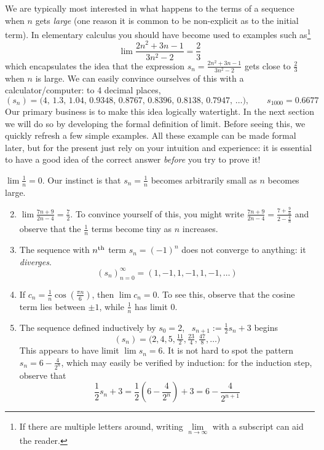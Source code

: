 We are typically most interested in what happens to the terms of a sequence when $n$ gets \emph{large} (one reason it is common to be non-explicit as to the initial term). In elementary calculus you should have become used to examples such as\footnote{%
	If there are multiple letters around, writing $\lim\limits_{n\to\infty}$ with a subscript can aid the reader.%
}
\[
	\lim\frac{2n^2+3n-1}{3n^2-2}=\frac 23
\]
which encapsulates the idea that the expression $s_n=\frac{2n^2+3n-1}{3n^2-2}$ gets close to $\frac 23$ when $n$ is large. We can easily convince ourselves of this with a calculator/computer: to 4 decimal places,
\[
	(s_n)=\bigl(4,\,1.3,\,1.04,\,
 	0.9348,\,
 	0.8767,\,
 	0.8396,\,
 	0.8138,\,
 	0.7947,\,\ldots\bigr),\qquad 
 	s_{1000}=0.6677
\]
Our primary business is to make this idea logically watertight. In the next section we will do so by developing the formal definition of limit. Before seeing this, we quickly refresh a few simple examples. All these example can be made formal later, but for the present just rely on your intuition and experience: it is essential to have a good idea of the correct answer \emph{before} you try to prove it!

\goodbreak

\begin{examples}{}{}
	\exstart $\lim \frac 1n=0$. Our instinct is that $s_n=\frac 1n$ becomes arbitrarily small as $n$ becomes large. 
	\begin{enumerate}\setcounter{enumi}{1}
	  \item $\lim\frac{7n+9}{2n-4}=\frac 72$. To convince yourself of this, you might write $\frac{7n+9}{2n-4}=\frac{7+\frac 9n}{2-\frac 4n}$
	  and observe that the $\frac 1n$ terms become tiny as $n$ increases.
	  \item The sequence with $n\textsuperscript{th}$ term $s_n=(-1)^n$ does not converge to anything: it \emph{diverges}.
	  \[
	  	(s_n)_{n=0}^\infty=(1,-1,1,-1,1,-1,\ldots)
	  \]
	  \item If $c_n=\frac 1n\cos\left(\frac{\pi n}6\right)$, then $\lim c_n=0$. To see this, observe that the cosine term lies between $\pm 1$, while $\frac 1n$ has limit 0.
	  \item The sequence defined inductively by $s_0=2$, \ $s_{n+1}:=\frac 12s_n+3$ begins
	  \[
	  	(s_n)=\bigl(2,4,5,\tfrac{11}2,\tfrac{23}4,\tfrac{47}8,\ldots\bigr)
	  \]
	  This appears to have limit $\lim s_n=6$. It is not hard to spot the pattern $s_n=6-\frac{4}{2^n}$, which may easily be verified by induction: for the induction step, observe that
	  \[
	  	\frac 12s_n+3=\frac 12\left(6-\frac 4{2^n}\right) +3 =6-\frac 4{2^{n+1}}
	  \]
	\end{enumerate}
\end{examples} 


